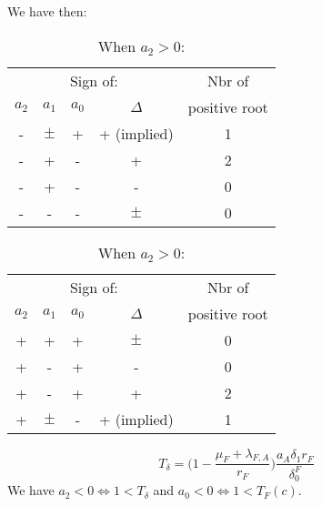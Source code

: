 \documentclass{article}
\newcommand{\lfa}{\lambda_{F, A}}
\newcommand{\df}{\delta_0^F}
\begin{document}
\begin{appendices}
We have then:
\begin{table}[!ht]
\begin{minipage}[c]{0.45\linewidth}
\centering
\caption{When $a_2 < 0\Leftrightarrow 1 < T_\delta $:}
\begin{tabular}{c|c|c|c|c}
\multicolumn{4}{c|}{Sign of:} & Nbr of \\
$a_2$ & $a_1$ & $a_0$ & $\Delta$ & positive root \\
\hline
- & $\pm$ & + & + (implied) & 1 \\
- & + & - & + & 2 \\
- & + & - & - & 0 \\
- & - & - & $\pm$ & 0 \\
\end{tabular}
\end{minipage}
\hfill
\begin{minipage}[c]{0.45\linewidth}
\centering
\caption{When $a_2 > 0$:}
\begin{tabular}{c|c|c|c|c}
\multicolumn{4}{c|}{Sign of:} & Nbr of \\
$a_2$ & $a_1$ & $a_0$ & $\Delta$ & positive root \\
\hline
+ & + & + & $\pm$ & 0 \\
+ & - & + & - & 0 \\
+ & - & + & + & 2 \\
+ & $\pm$ & - & + (implied) & 1 \\
\end{tabular}
\end{minipage}
\end{table}
$$
T_\delta = \Big(1 - \dfrac{\mu_F + \lfa}{r_F} \Big) \dfrac{a_A \delta_1 r_F}{\df}
$$
We have $a_2 < 0 \Leftrightarrow 1 < T_\delta$ and $a_0 < 0 \Leftrightarrow 1 < T_F(c)$.


\end{appendices}
\end{document}

